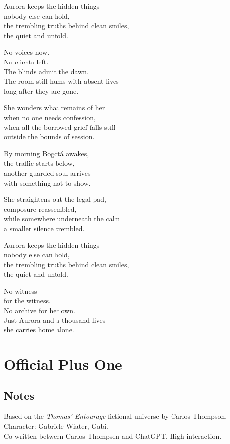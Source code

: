 \begin{lyrics}
Aurora keeps the hidden things\\
nobody else can hold,\\
the trembling truths behind clean smiles,\\
the quiet and untold.

No voices now.\\
No clients left.\\
The blinds admit the dawn.\\
The room still hums with absent lives\\
long after they are gone.

She wonders what remains of her\\
when no one needs confession,\\
when all the borrowed grief falls still\\
outside the bounds of session.

By morning Bogotá awakes,\\
the traffic starts below,\\
another guarded soul arrives\\
with something not to show.

She straightens out the legal pad,\\
composure reassembled,\\
while somewhere underneath the calm\\
a smaller silence trembled.

Aurora keeps the hidden things\\
nobody else can hold,\\
the trembling truths behind clean smiles,\\
the quiet and untold.

No witness\\
for the witness.\\
No archive for her own.\\
Just Aurora and a thousand lives\\
she carries home alone.

\end{lyrics}

\section{Official Plus One}

\subsection{Notes}
Based on the \emph{Thomas' Entourage} fictional universe by Carlos Thompson.\\
Character: Gabriele Wiater, Gabi.\\
Co-written between Carlos Thompson and ChatGPT. High interaction.

